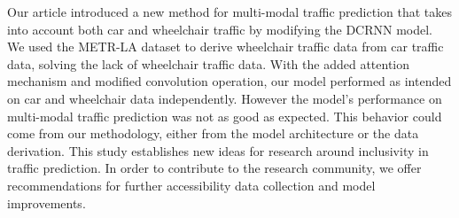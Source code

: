 Our article introduced a new method for multi-modal traffic prediction that takes into account both car and wheelchair traffic by modifying the DCRNN model.
We used the METR-LA dataset to derive wheelchair traffic data from car traffic data, solving the lack of wheelchair traffic data.
With the added attention mechanism and modified convolution operation, our model performed as intended on car and wheelchair data independently.
However the model's performance on multi-modal traffic prediction was not as good as expected.
This behavior could come from our methodology, either from the model architecture or the data derivation.
This study establishes new ideas for research around inclusivity in traffic prediction.
In order to contribute to the research community, we offer recommendations for further accessibility data collection and model improvements.